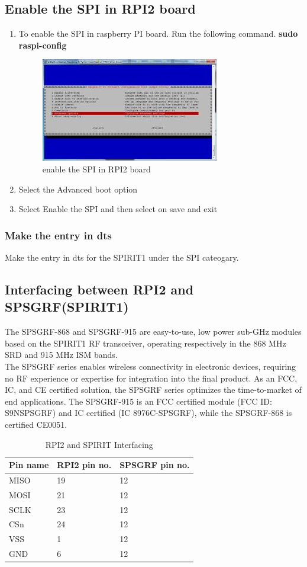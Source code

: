 \subsection{Enable the SPI in RPI2 board}
	\begin{enumerate}
		\item To enable the SPI in raspberry PI board. Run the following command.
			\textbf{sudo raspi-config}
			\begin{figure}[ht]
				\centering
				\includegraphics[scale=1.2]{images/spi.png}
				\caption{enable the SPI in RPI2 board}
			\end{figure}
		\item Select the Advanced boot option
		\item Select Enable the SPI and then select on save and exit
	\end{enumerate}
\subsubsection{Make the entry in dts}
Make the entry in dts for the SPIRIT1 under the SPI cateogary.
\subsection{Interfacing between RPI2 and SPSGRF(SPIRIT1)}
The SPSGRF-868 and SPSGRF-915 are easy-to-use, low power sub-GHz modules based on the SPIRIT1 RF transceiver, operating respectively in the 868 MHz SRD and 915 MHz ISM bands.\\
The SPSGRF series enables wireless connectivity in electronic devices, requiring no RF experience or expertise for integration into the final product. As an FCC, IC, and CE certified solution, the SPSGRF series optimizes the time-to-market of end applications. The SPSGRF-915 is an FCC certified module (FCC ID: S9NSPSGRF) and IC certified (IC 8976C-SPSGRF), while the SPSGRF-868 is certified CE0051.
\begin{table}[ht]
	\centering
	\scalebox{1}
	{
		\begin{tabular}{|K{3cm} | K{2cm} | K{5cm}|}
		\toprule
		\textbf{Pin name} & \textbf{RPI2 pin no.} & \textbf{SPSGRF pin no.} \\
		\hline
		MISO & 19 & 12 \\
		\hline
		MOSI & 21 & 12 \\
		\hline
		SCLK & 23 & 12 \\
		\hline
		CSn & 24 & 12 \\
		\hline
		VSS & 1 & 12 \\
		\hline
		GND & 6 & 12 \\
		\bottomrule
		\end{tabular}
	}
	\caption{RPI2 and SPIRIT Interfacing}
\end{table}
